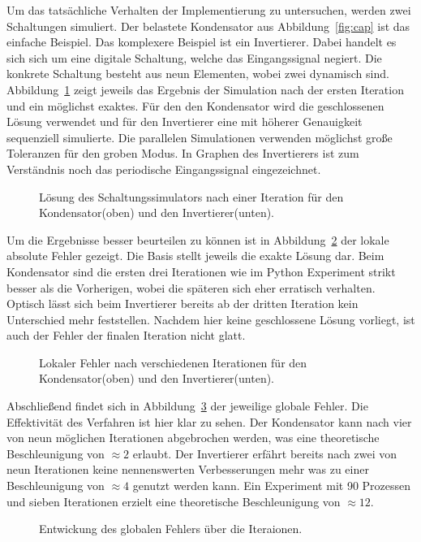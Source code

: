 Um das tatsächliche Verhalten der Implementierung zu untersuchen, werden zwei Schaltungen simuliert. Der belastete Kondensator aus Abbildung~\ref{fig:cap} ist das einfache Beispiel. Das komplexere Beispiel ist ein Invertierer. Dabei handelt es sich sich um eine digitale Schaltung, welche das Eingangssignal negiert. Die konkrete Schaltung besteht aus neun Elementen, wobei zwei dynamisch sind. Abbildung~\ref{fig:sol_sim} zeigt jeweils das Ergebnis der Simulation nach der ersten Iteration und ein möglichst exaktes. Für den den Kondensator wird die geschlossenen Lösung verwendet und für den Invertierer eine mit höherer Genauigkeit sequenziell simulierte. Die parallelen Simulationen verwenden möglichst große Toleranzen für den groben Modus. In Graphen des Invertierers ist zum Verständnis noch das periodische Eingangssignal eingezeichnet.\\
\begin{figure}[ht]
    \centering
        
        
    \caption{Lösung des Schaltungssimulators nach einer Iteration für den Kondensator(oben) und den Invertierer(unten).}
    \label{fig:sol_sim}
\end{figure}

Um die Ergebnisse besser beurteilen zu können ist in Abbildung~\ref{fig:error_local_sim} der lokale absolute Fehler gezeigt. Die Basis stellt jeweils die exakte Lösung dar. Beim Kondensator sind die ersten drei Iterationen wie im Python Experiment strikt besser als die Vorherigen, wobei die späteren sich eher erratisch verhalten. Optisch lässt sich beim Invertierer bereits ab der dritten Iteration kein Unterschied mehr feststellen. Nachdem hier keine geschlossene Lösung vorliegt, ist auch der Fehler der finalen Iteration nicht glatt.\\
\begin{figure}[ht]
    \centering
        
        
    \caption{Lokaler Fehler nach verschiedenen Iterationen für den Kondensator(oben) und den Invertierer(unten).}
    \label{fig:error_local_sim}
\end{figure}

Abschließend findet sich in Abbildung~\ref{fig:error_global_sim} der jeweilige globale Fehler. Die Effektivität des Verfahren ist hier klar zu sehen. Der Kondensator kann nach vier von neun möglichen Iterationen abgebrochen werden, was eine theoretische Beschleunigung von \(\approx2\) erlaubt. Der Invertierer erfährt bereits nach zwei von neun Iterationen keine nennenswerten Verbesserungen mehr was zu einer Beschleunigung von \(\approx4\) genutzt werden kann. Ein Experiment mit 90 Prozessen und sieben Iterationen erzielt eine theoretische Beschleunigung von \(\approx12\).
\begin{figure}[ht]
    \centering
        
        
    \caption{Entwickung des globalen Fehlers über die Iteraionen.}
    \label{fig:error_global_sim}
\end{figure}